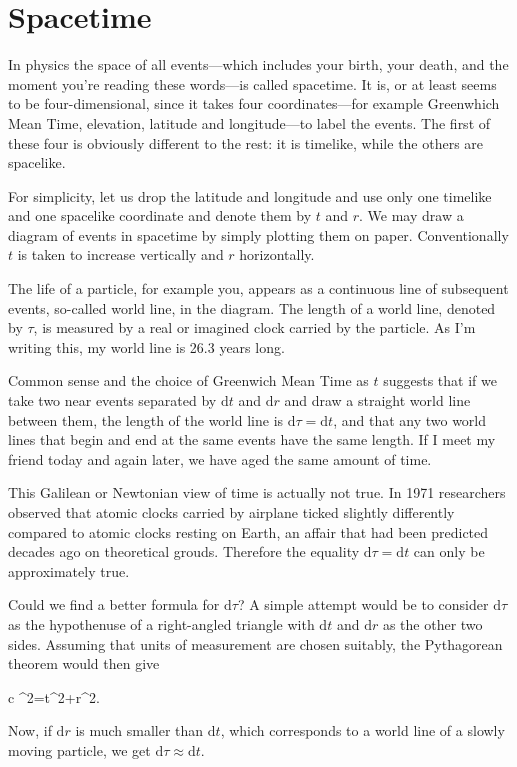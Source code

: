 \documentclass[11pt,oneside%
]{memoir}
\newenvironment{eqna}{\begin{IEEEeqnarray*}{c}}{\end{IEEEeqnarray*}\ignorespacesafterend}
\newcommand{\dd}{\mathrm{d}}
\begin{document}
\chapter{Spacetime}

In physics the space of all events---which includes your birth, your death, and the moment you're reading these words---is called spacetime. It is, or at least seems to be four-dimensional, since it takes four coordinates---for example Greenwhich Mean Time, elevation, latitude and longitude---to label the events. The first of these four is obviously different to the rest: it is timelike, while the others are spacelike.

For simplicity, let us drop the latitude and longitude and use only one timelike and one spacelike coordinate and denote them by \(t\) and \(r\). We may draw a diagram of events in spacetime by simply plotting them on paper. Conventionally \(t\) is taken to increase vertically and \(r\) horizontally.

The life of a particle, for example you, appears as a continuous line of subsequent events, so-called world line, in the diagram. The length of a world line, denoted by \(\tau\), is measured by a real or imagined clock carried by the particle. As I'm writing this, my world line is 26.3 years long.

Common sense and the choice of Greenwich Mean Time as \(t\) suggests that if we take two near events separated by \(\dd t\) and \(\dd r\) and draw a straight world line between them, the length of the world line is \(\dd\tau = \dd t\), and that any two world lines that begin and end at the same events have the same length. If I meet my friend today and again later, we have aged the same amount of time.

This Galilean or Newtonian view of time is actually not true. In 1971 researchers observed that atomic clocks carried by airplane ticked slightly differently compared to atomic clocks resting on Earth, an affair that had been predicted decades ago on theoretical grouds. Therefore the equality \(\dd\tau = \dd t\) can only be approximately true.

Could we find a better formula for \(\dd\tau\)? A simple attempt would be to consider \(\dd\tau\) as the hypothenuse of a right-angled triangle with \(\dd t\) and \(\dd r\) as the other two sides. Assuming that units of measurement are chosen suitably, the Pythagorean theorem would then give
\begin{eqna}
\dd\tau^2=\dd t^2+\dd r^2.
\end{eqna}
Now, if \(\dd r\) is much smaller than \(\dd t\), which corresponds to a world line of a slowly moving particle, we get \(\dd\tau\approx\dd t\).
\end{document}
